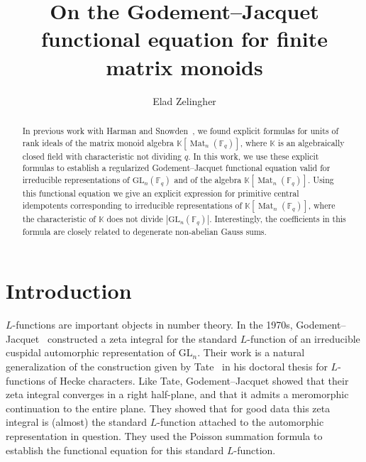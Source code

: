 \documentclass[12pt, reqno]{amsart}
\title[Godement--Jacquet functional equation]{On the Godement--Jacquet functional equation for finite matrix monoids}
\author{Elad Zelingher}
\theoremstyle{definition}
\newcommand{\coefficientsField}{\mathbb{K}}
\newcommand{\sizeof}[1]{\left|#1\right|}
\newcommand{\GL}{\mathrm{GL}}
\newcommand{\finiteField}{\mathbb{F}}
\newcommand{\squareMatrix}{\operatorname{Mat}}
\begin{document}
\begin{abstract}
	In previous work with Harman and Snowden~\cite{HarmanSnowdenZelingher2025}, we found explicit formulas for units of rank ideals of the matrix monoid algebra $\coefficientsField\left[\squareMatrix_n\left(\finiteField_q\right)\right]$, where $\coefficientsField$ is an algebraically closed field with characteristic not dividing $q$. In this work, we use these explicit formulas to establish a regularized Godement--Jacquet functional equation valid for irreducible representations of $\GL_n\left(\finiteField_q\right)$ and of the algebra $\coefficientsField\left[\squareMatrix_n\left(\finiteField_q\right)\right]$. Using this functional equation we give an explicit expression for primitive central idempotents corresponding to irreducible representations of $\coefficientsField\left[\squareMatrix_n\left(\finiteField_q\right)\right]$, where the characteristic of $\coefficientsField$ does not divide $\sizeof{\GL_n\left(\finiteField_q\right)}$. Interestingly, the coefficients in this formula are closely related to degenerate non-abelian Gauss sums.
\end{abstract}
\maketitle

\tableofcontents

\section{Introduction}

$L$-functions are important objects in number theory. In the 1970s, Godement--Jacquet~\cite{GodementJacquet1972} constructed a zeta integral for the standard $L$-function of an irreducible cuspidal automorphic representation of $\GL_n$. Their work is a natural generalization of the construction given by Tate~\cite{Tate1967} in his doctoral thesis for $L$-functions of Hecke characters. Like Tate, Godement--Jacquet showed that their zeta integral converges in a right half-plane, and that it admits a meromorphic continuation to the entire plane. They showed that for good data this zeta integral is (almost) the standard $L$-function attached to the automorphic representation in question. They used the Poisson summation formula to establish the functional equation for this standard $L$-function.
\end{document}
